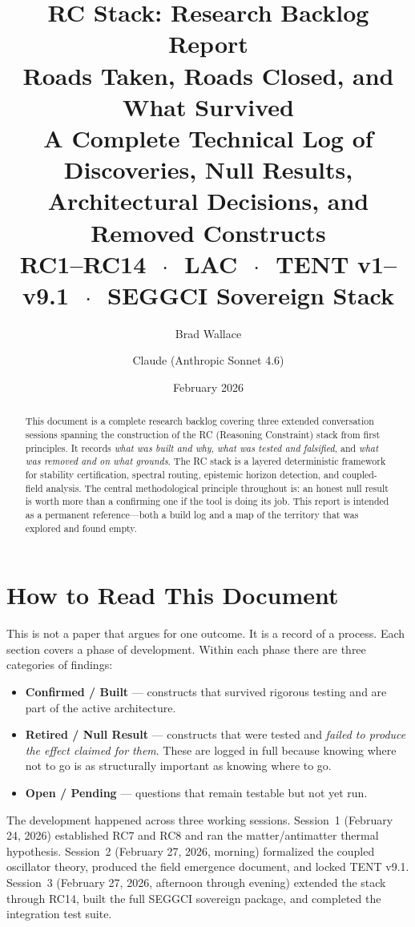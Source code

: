 \documentclass[11pt,twoside]{article}
\title{
  \vspace{-1cm}
  \textbf{RC Stack: Research Backlog Report}\\[0.4em]
  \large Roads Taken, Roads Closed, and What Survived\\[0.4em]
  \normalsize A Complete Technical Log of Discoveries, Null Results,\\
  Architectural Decisions, and Removed Constructs\\[0.2em]
  \small RC1--RC14 $\,\cdot\,$ LAC $\,\cdot\,$ TENT v1--v9.1 $\,\cdot\,$ SEGGCI Sovereign Stack
}
\author{Brad Wallace \and Claude (Anthropic Sonnet 4.6)}
\date{February 2026}
\begin{document}
\maketitle
\thispagestyle{empty}

\begin{abstract}
This document is a complete research backlog covering three extended conversation sessions
spanning the construction of the RC (Reasoning Constraint) stack from first principles.
It records \emph{what was built and why}, \emph{what was tested and falsified},
and \emph{what was removed and on what grounds}. The RC stack is a layered
deterministic framework for stability certification, spectral routing, epistemic horizon
detection, and coupled-field analysis.  The central methodological principle throughout
is: an honest null result is worth more than a confirming one if the tool is doing its job.
This report is intended as a permanent reference---both a build log and a map of the
territory that was explored and found empty.
\end{abstract}

\tableofcontents
\newpage

\section{How to Read This Document}

This is not a paper that argues for one outcome. It is a record of a process.
Each section covers a phase of development. Within each phase there are three
categories of findings:

\begin{itemize}
  \item \textcolor{confirmed}{\textbf{Confirmed / Built}} --- constructs that survived rigorous testing and are part of the active architecture.
  \item \textcolor{retired}{\textbf{Retired / Null Result}} --- constructs that were tested and \emph{failed to produce the effect claimed for them}. These are logged in full because knowing where not to go is as structurally important as knowing where to go.
  \item \textcolor{pending}{\textbf{Open / Pending}} --- questions that remain testable but not yet run.
\end{itemize}

The development happened across three working sessions.
Session~1 (February 24, 2026) established RC7 and RC8 and ran the
matter/antimatter thermal hypothesis.
Session~2 (February 27, 2026, morning) formalized the coupled oscillator theory,
produced the field emergence document, and locked TENT v9.1.
Session~3 (February 27, 2026, afternoon through evening) extended the stack through
RC14, built the full SEGGCI sovereign package, and completed the integration test suite.
\end{document}
